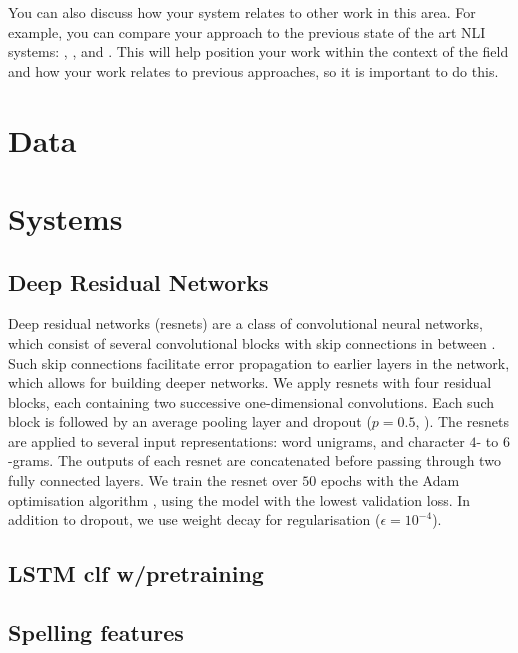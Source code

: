 \documentclass[11pt,letterpaper]{article}
\begin{document}
You can also discuss how your system relates to other work in this area. For example, you can compare your approach to the previous state of the art NLI systems: \cite{malmasi:2017:nlisg}, \cite{ionescu:2014}, \cite{bykh:2014} and \cite{jarvis-bestgen-pepper:2013:BEA8}.
This will help position your work within the context of the field and how your work relates to previous approaches, so it is important to do this.

\section{Data}

\section{Systems}

\subsection{Deep Residual Networks}

Deep residual networks (resnets) are a class of convolutional neural networks, which consist of several convolutional blocks with skip connections in between \citep{He2016identity}.
Such skip connections facilitate error propagation to earlier layers in the network, which allows for building deeper networks.
We apply resnets with four residual blocks, each containing two successive one-dimensional convolutions.
Each such block is followed by an average pooling layer and dropout ($p=0.5$, \citet{dropout}).
The resnets are applied to several input representations: word unigrams, and character $4$- to $6$-grams.
The outputs of each resnet are concatenated before passing through two fully connected layers.
We train the resnet over $50$ epochs with the Adam optimisation algorithm \citep{adam}, using the model with the lowest validation loss.
In addition to dropout, we use weight decay for regularisation ($\epsilon=10^{-4}$).

\subsection{LSTM clf w/pretraining}


\subsection{Spelling features}
\end{document}
